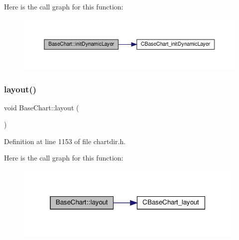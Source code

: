 Here is the call graph for this function\+:
\nopagebreak
\begin{figure}[H]
\begin{center}
\leavevmode
\includegraphics[width=350pt]{class_base_chart_acef63841f659fbacdad0b1a63997a89c_cgraph}
\end{center}
\end{figure}
\mbox{\label{class_base_chart_a1a44c678189fcf8b7b58bd37dd3dcd3d}} 
\subsubsection{\texorpdfstring{layout()}{layout()}}
{\footnotesize\ttfamily void Base\+Chart\+::layout (\begin{DoxyParamCaption}{ }\end{DoxyParamCaption})\hspace{0.3cm}{\ttfamily [inline]}}



Definition at line 1153 of file chartdir.\+h.

Here is the call graph for this function\+:
\nopagebreak
\begin{figure}[H]
\begin{center}
\leavevmode
\includegraphics[width=313pt]{class_base_chart_a1a44c678189fcf8b7b58bd37dd3dcd3d_cgraph}
\end{center}
\end{figure}
\mbox{\label{class_base_chart_a3b89c7ea3cce0558699dea32bcfba330}} 
